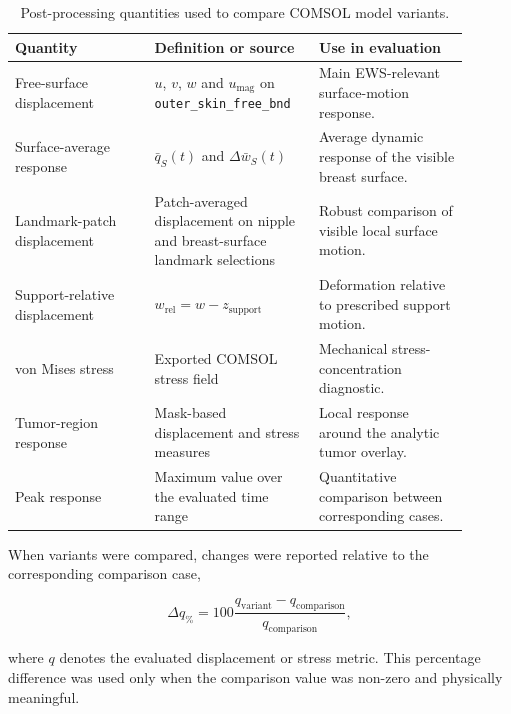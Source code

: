 \begin{table}[H]
\centering
\small
\caption{Post-processing quantities used to compare COMSOL model variants.}
\label{post_processing_metrics_table}
\begin{tabular}{p{0.28\linewidth} p{0.32\linewidth} p{0.30\linewidth}}
\toprule
Quantity & Definition or source & Use in evaluation \\
\midrule
Free-surface displacement 
& $u$, $v$, $w$ and $u_{\mathrm{mag}}$ on \texttt{outer\_skin\_free\_bnd} 
& Main EWS-relevant surface-motion response. \\

Surface-average response 
& $\bar{q}_{S}(t)$ and $\Delta \bar{w}_{S}(t)$ 
& Average dynamic response of the visible breast surface. \\

Landmark-patch displacement 
& Patch-averaged displacement on nipple and breast-surface landmark selections 
& Robust comparison of visible local surface motion. \\

Support-relative displacement 
& $w_{\mathrm{rel}}=w-z_{\mathrm{support}}$ 
& Deformation relative to prescribed support motion. \\

von Mises stress 
& Exported COMSOL stress field 
& Mechanical stress-concentration diagnostic. \\

Tumor-region response 
& Mask-based displacement and stress measures 
& Local response around the analytic tumor overlay. \\

Peak response 
& Maximum value over the evaluated time range 
& Quantitative comparison between corresponding cases. \\
\bottomrule
\end{tabular}
\end{table}

When variants were compared, changes were reported relative to the corresponding comparison case,

\begin{equation}
\Delta q_{\%}
=
100
\frac{q_{\mathrm{variant}}-q_{\mathrm{comparison}}}{q_{\mathrm{comparison}}},
\label{relative_metric_difference}
\end{equation}

where $q$ denotes the evaluated displacement or stress metric. This percentage difference was used only when the comparison value was non-zero and physically meaningful.

